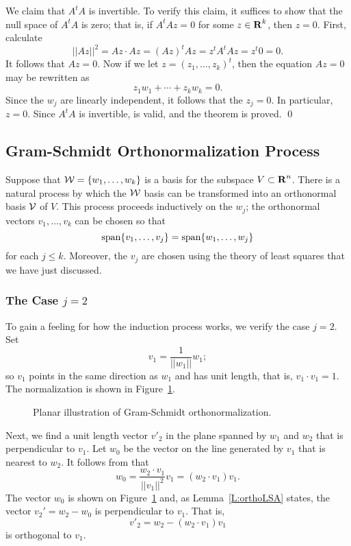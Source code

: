 We claim that $A^tA$ is invertible.  To verify this claim, it suffices to
show that the null space
of $A^tA$ is zero; that is, if $A^tA z = 0$ for some
$z\in\mbox{$\bf{R}$}^k$, then $z=0$.  First, calculate
\[
||Az||^2 = Az\cdot Az = (Az)^tAz = z^tA^tAz= z^t0 = 0.
\]
It follows that $Az=0$.  Now if we let $z=(z_1,\ldots,z_k)^t$, then the
equation $Az=0$ may be rewritten as
\[
z_1w_1 + \cdots + z_kw_k = 0.
\]
Since the $w_j$ are linearly independent, it follows that the $z_j=0$.  In
particular, $z=0$.  Since $A^tA$ is invertible,  is
valid, and the theorem is proved. \qed


\subsection*{Gram-Schmidt Orthonormalization Process}

Suppose that ${\cal W} = \{w_1,\ldots,w_k\}$ is a basis for the subspace
$V\subset\mbox{$\bf{R}$}^n$.  There is a natural process by which the ${\cal W}$ basis
can be transformed into an
orthonormal basis
${\cal V}$ of $V$.  This
process proceeds inductively on the $w_j$; the orthonormal vectors
$v_1,\ldots,v_k$ can be chosen so that
\[
{\rm span}\{v_1,\ldots,v_j\} = {\rm span}\{w_1,\ldots,w_j\}
\]
for each $j\leq k$.  Moreover, the $v_j$ are chosen using the theory of
least squares that we have just discussed.

\subsubsection*{The Case $j=2$}

To gain a feeling for how the induction process works, we verify the case
$j=2$.  Set
\begin{equation}  \label{E:ortho1}
v_1 = \frac{1}{||w_1||}w_1;
\end{equation}
so $v_1$ points in the same direction as $w_1$ and has unit length, that is,
$v_1\cdot v_1=1$.  The normalization is shown in Figure~\ref{F:gram}.

\begin{figure}[htb]
        \centerline{%
        }
        \caption{Planar illustration of Gram-Schmidt orthonormalization.}
        \label{F:gram}
\end{figure}

Next, we find a unit length vector $v'_2$ in the plane spanned by $w_1$ and
$w_2$ that is perpendicular
to $v_1$. Let $w_0$ be the vector on the line
generated by $v_1$ that is nearest to $w_2$.  It follows from
 that
\[
w_0 = \frac{w_2\cdot v_1}{||v_1||^2}v_1 = (w_2\cdot v_1) v_1.
\]
The vector $w_0$ is shown on Figure~\ref{F:gram} and, as
Lemma~\ref{L:orthoLSA} states, the vector $v_2'=w_2-w_0$ is perpendicular to
$v_1$. That is,
\begin{equation}  \label{E:ortho2}
v'_2 = w_2 - (w_2\cdot v_1) v_1
\end{equation}
is orthogonal to $v_1$.

